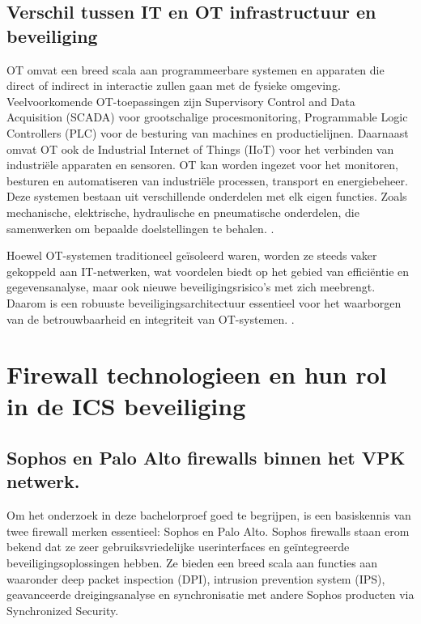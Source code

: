 \subsection{Verschil tussen IT en OT infrastructuur en beveiliging}

OT omvat een breed scala aan programmeerbare systemen en apparaten die direct of indirect in interactie zullen gaan met de fysieke omgeving. Veelvoorkomende OT-toepassingen zijn Supervisory Control and Data Acquisition (SCADA) voor grootschalige procesmonitoring, Programmable Logic Controllers (PLC) voor de besturing van machines en productielijnen. Daarnaast omvat OT ook de Industrial Internet of Things (IIoT) voor het verbinden van industriële apparaten en sensoren. OT kan worden ingezet voor het monitoren, besturen en automatiseren van industriële processen, transport en energiebeheer. Deze systemen bestaan uit verschillende onderdelen met elk eigen functies. Zoals mechanische, elektrische, hydraulische en pneumatische onderdelen, die samenwerken om bepaalde doelstellingen te behalen. \autocite{Stouffer2023}.

\vspace{5mm}
Hoewel OT-systemen traditioneel geïsoleerd waren, worden ze steeds vaker gekoppeld aan IT-netwerken, wat voordelen biedt op het gebied van efficiëntie en gegevensanalyse, maar ook nieuwe beveiligingsrisico’s met zich meebrengt. Daarom is een robuuste beveiligingsarchitectuur essentieel voor het waarborgen van de betrouwbaarheid en integriteit van OT-systemen. \autocite{Stouffer2023}.

\section{Firewall technologieen en hun rol in de ICS beveiliging}

\subsection{Sophos en Palo Alto firewalls binnen het VPK netwerk.}
Om het onderzoek in deze bachelorproef goed te begrijpen, is een basiskennis van twee firewall merken essentieel: Sophos en Palo Alto. Sophos firewalls staan erom bekend dat ze zeer gebruiksvriedelijke userinterfaces en geïntegreerde beveiligingsoplossingen hebben. Ze bieden een breed scala aan functies aan waaronder deep packet inspection (DPI), intrusion prevention system (IPS), geavanceerde dreigingsanalyse en synchronisatie met andere Sophos producten via Synchronized Security. \autocite{Phipps2024}

